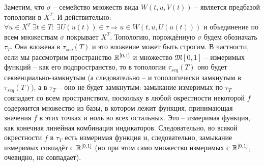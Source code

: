 \begin{note}
    Заметим, что $\sigma$ -- семейство множеств вида $W(t, u, V(t))$ -- является предбазой топологии в $X^T$.
    И действительно: $\forall u \in X^T \ \exists t \in T \colon \ \exists U(u(t)) \in \tau \Rightarrow u \in W(t, u, U(u(t)))$ и объединение по всем множествам $\sigma$ покрывает $X^T$.
    Топологию, порождённую $\sigma$ будем обозначать $\tau_T$.
    Она вложена в $\tau_{seq}(T)$ и это вложение может быть строгим.
    В частности, если мы рассмотрим пространство $\mathbb{R}^{[0, 1]}$ и множество $\mathfrak{M}[0, 1]$ -- измеримых функций -- как его подпространство, то в топологии $\tau_{seq}(T)$ оно будет секвенциально-замкнутым (а следовательно -- и топологически замкнутым в $\tau_{seq}(T)$), а в $\tau_{T}$ -- оно не будет замкнутым: замыкание измеримых по $\tau_T$ совпадает со всем пространством, поскольку в любой окрестности некоторой $f$ содержится множество из базы, в котором лежит функция, принимающая значения $f$ в этих точках и ноль во всех остальных.
    Это -- измеримая функция, как конечная линейная комбинация индикаторов.
    Следовательно, во всякой окрестности $f$ в $\tau_{T}$ есть измеримая функция и, следовательно, замыкание измеримых совпадёт с $\mathbb{R}^{[0, 1]}$ (но при этом само множество измеримых с $\mathbb{R}^{[0, 1]}$, очевидно, не совпадает).
\end{note}

